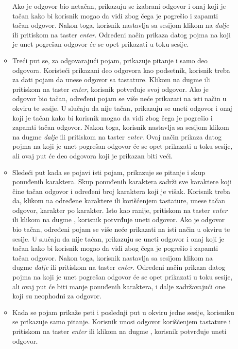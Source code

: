 \begin{itemize}
\begin{itemize}
    Ako je odgovor bio netačan, prikazuju se izabrani odgovor i onaj koji je tačan kako bi korisnik mogao da vidi zbog čega je pogrešio i zapamti tačan odgovor.
    Nakon toga, korisnik nastavlja sa sesijom klikom na \emph{dalje} ili pritiskom na taster \emph{enter}.
    Određeni način prikaza datog pojma na koji je unet pogrešan odgovor će se opet prikazati u toku sesije.
    \item
    Treći put se, za odgovarajući pojam, prikazuje pitanje i samo deo odgovora.
    Koristeći prikazani deo odgovora kao podsetnik, korisnik treba za dati pojam da unese odgovor sa tastature.
    Klikom na dugme  ili pritiskom na taster \emph{enter}, korisnik potvrđuje svoj odgovor.
    Ako je odgovor bio tačan, određeni pojam se više neće prikazati na isti način u okviru te sesije.
    U slučaju da nije tačan, prikazuju se uneti odgovor i onaj koji je tačan kako bi korisnik mogao da vidi zbog čega je pogrešio i zapamti tačan odgovor.
    Nakon toga, korisnik nastavlja sa sesijom klikom na dugme \emph{dalje} ili pritiskom na taster \emph{enter}.
    Ovaj način prikaza datog pojma na koji je unet pogrešan odgovor će se opet prikazati u toku sesije, ali ovaj put će deo odgovora koji je prikazan biti veći.
    \item
    Sledeći put kada se pojavi isti pojam, prikazuje se pitanje i skup ponuđenih karaktera.
    Skup ponuđenih karaktera sadrži sve karaktere koji čine tačan odgovor i određeni broj karaktera koji je višak.
    Korisnik treba da, klikom na određene karaktere ili korišćenjem tastature, unese tačan odgovor, karakter po karakter.
    Isto kao ranije, pritiskom na taster \emph{enter} ili klikom na dugme , korisnik potvrđuje uneti odgovor.
    Ako je odgovor bio tačan, određeni pojam se više neće prikazati na isti način u okviru te sesije.
    U slučaju da nije tačan, prikazuju se uneti odgovor i onaj koji je tačan kako bi korisnik mogao da vidi zbog čega je pogrešio i zapamti tačan odgovor.
    Nakon toga, korisnik nastavlja sa sesijom klikom na dugme \emph{dalje} ili pritiskom na taster \emph{enter}.
    Određeni način prikaza datog pojma na koji je unet pogrešan odgovor će se opet prikazati u toku sesije, ali ovaj put će biti manje ponuđenih karaktera, i dalje zadržavajući one koji su neophodni za odgovor.
    \item
    Kada se pojam prikaže peti i poslednji put u okviru jedne sesije, korisniku se prikazuje samo pitanje.
    Korisnik unosi odgovor korišćenjem tastature i pritiskom na taster \emph{enter} ili klikom na dugme , korisnik potvrđuje uneti odgovor.

\end{itemize}
\end{itemize}
